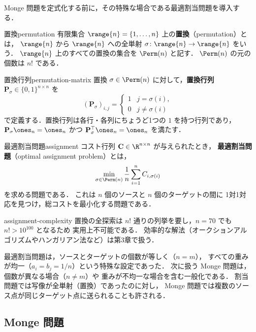 Monge 問題を定式化する前に，その特殊な場合である最適割当問題を導入する．

\begin{definition}{置換}{permutation}
  有限集合 $\range{n} = \{1, \ldots, n\}$ 上の\textbf{置換}（permutation）とは，
  $\range{n}$ から $\range{n}$ への全単射 $\sigma \colon \range{n} \to \range{n}$ をいう．
  $\range{n}$ 上のすべての置換の集合を $\Perm(n)$ と記す．
  $\Perm(n)$ の元の個数は $n!$ である．
\end{definition}

\begin{definition}{置換行列}{permutation-matrix}
  置換 $\sigma \in \Perm(n)$ に対して，\textbf{置換行列} $\mathbf{P}_\sigma \in \{0, 1\}^{n \times n}$ を
  \[
    (\mathbf{P}_\sigma)_{i,j} =
    \begin{cases}
      1 & j = \sigma(i), \\
      0 & j \neq \sigma(i)
    \end{cases}
  \]
  で定義する．置換行列は各行・各列にちょうど1つの $1$ を持つ行列であり，
  $\mathbf{P}_\sigma \ones_n = \ones_n$ かつ $\mathbf{P}_\sigma^\top \ones_n = \ones_n$ を満たす．
\end{definition}

\begin{setting}{最適割当問題}{assignment}
  コスト行列 $\mathbf{C} \in \R^{n \times n}$ が与えられたとき，
  \textbf{最適割当問題}（optimal assignment problem）とは，
  \[
    \min_{\sigma \in \Perm(n)} \frac{1}{n} \sum_{i=1}^n C_{i, \sigma(i)}
  \]
  を求める問題である．
  これは $n$ 個のソースと $n$ 個のターゲットの間に
  1対1対応を見つけ，総コストを最小化する問題である．
\end{setting}

\begin{remark}{}{assignment-complexity}
  置換の全探索は $n!$ 通りの列挙を要し，$n = 70$ でも $n! > 10^{100}$ となるため
  実用上不可能である．
  効率的な解法（オークションアルゴリズムやハンガリアン法など）は第3章で扱う．
\end{remark}

最適割当問題は，ソースとターゲットの個数が等しく（$n = m$），
すべての重みが均一（$a_i = b_j = 1/n$）という特殊な設定であった．
次に扱う Monge 問題は，個数が異なる場合（$n \neq m$）や
重みが不均一な場合を含む一般化である．
割当問題では写像が全単射（置換）であったのに対し，
Monge 問題では複数のソース点が同じターゲット点に送られることも許される．

\subsection{Monge 問題}
\label{subsec:monge}


